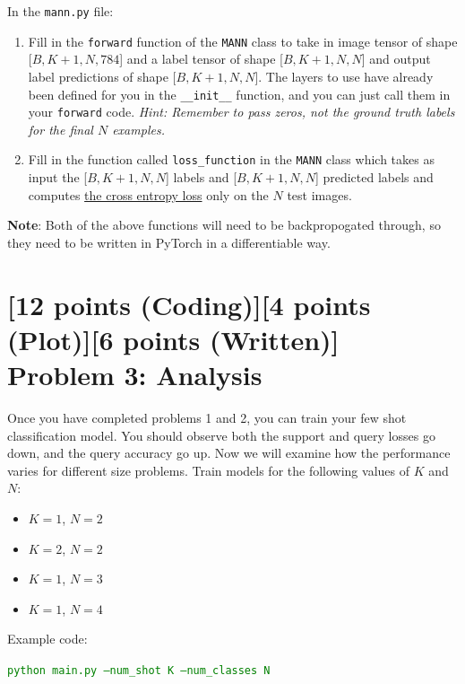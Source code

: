 \documentclass[12pt]{article}
\begin{document}
\noindent In the \texttt{mann.py} file:
\begin{enumerate}
    \item Fill in the \texttt{forward} function of the \texttt{MANN} class to take in image tensor of shape [$B, K+1, N, 784$] and a label tensor of shape [$B, K+1, N, N$] and output label predictions of shape [$B,K+1,N, N$]. The layers to use have already been defined for you in the \texttt{\_\_init\_\_} function, and you can just call them in your \texttt{forward} code. \textit{Hint: Remember to pass zeros, not the ground truth labels for the final $N$ examples.}
    \item  Fill in the function called \texttt{loss\_function} in the \texttt{MANN} class which takes as input the [$B,K+1,N, N$] labels and [$B,K+1,N, N$] predicted labels and computes \href{https://pytorch.org/docs/stable/generated/torch.nn.functional.cross_entropy.html#torch.nn.functional.cross_entropy}{the cross entropy loss} only on the $N$ test images. 
\end{enumerate}
\textbf{Note}: Both of the above functions will need to be backpropogated through, so they need to be written in PyTorch in a differentiable way.


\section*{[12 points (Coding)][4 points (Plot)][6 points (Written)]\\Problem 3: Analysis}

Once you have completed problems 1 and 2, you can train your few shot classification model. You should observe both the support and query losses go down, and the query accuracy go up. Now we will examine how the performance varies for different size problems.
Train models for the following values of $K$ and $N$:
\begin{itemize}
    \item $K = 1$, $N=2$ %
    \item $K = 2$, $N=2$ %
    \item $K = 1$, $N=3$ %
    \item $K = 1$, $N=4$ %
\end{itemize}

Example code:

\textcolor{green}{\texttt{python main.py --num\_shot K --num\_classes N}}
\end{document}
